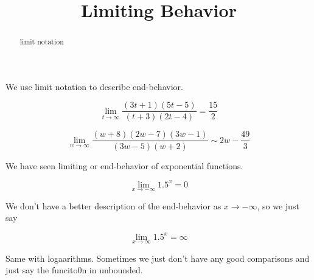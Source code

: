 \documentclass{ximera}
\title{Limiting Behavior}
\begin{document}
\begin{abstract}
limit notation
\end{abstract}
\maketitle





We use limit notation to describe end-behavior.


\[   \lim_{t \to \infty} \frac{(3t+1)(5t-5)}{(t+3)(2t-4)} = \frac{15}{2}       \]



\[   \lim_{w \to \infty} \frac{(w+8)(2w-7)(3w-1)}{(3w-5)(w+2)}    \sim    2w -\frac{49}{3}       \]




We have seen limiting or end-behavior of exponential functions.


\[   \lim_{x \to -\infty} 1.5^x   = 0      \]


\begin{image}
\end{image}



We don't have a better description of the end-behavior as $x \to -\infty$, so we just say 


\[   \lim_{x \to \infty} 1.5^x   = \infty      \]






Same with logaarithms.  Sometimes we just don't have any good comparisons and just say the funcito0n in unbounded.
\end{document}
